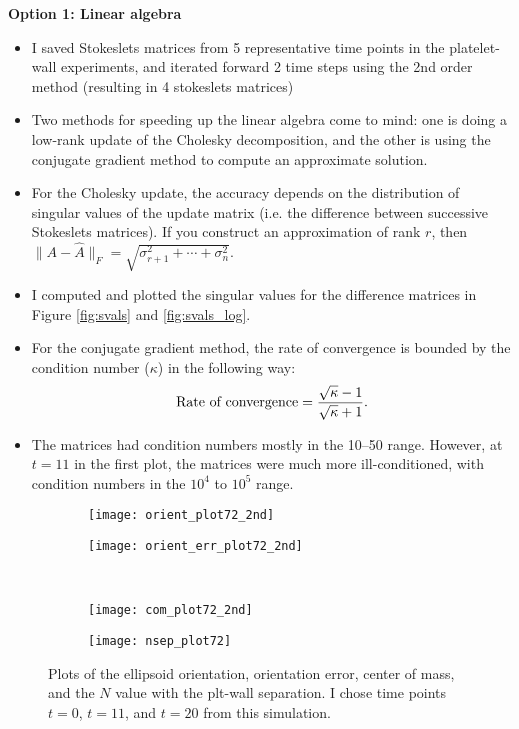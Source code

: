 \documentclass{article}
\newcommand{\tn}{\textnormal}
\begin{document}
\textbf{Option 1: Linear algebra}
\begin{itemize}
\item I saved Stokeslets matrices from 5 representative time points in
  the platelet-wall experiments, and iterated forward 2 time steps
  using the 2nd order method (resulting in 4 stokeslets matrices)
\item Two methods for speeding up the linear algebra come to mind: one
  is doing a low-rank update of the Cholesky decomposition, and the
  other is using the conjugate gradient method to compute an
  approximate solution.
\item For the Cholesky update, the accuracy depends on the
  distribution of singular values of the update matrix (i.e. the
  difference between successive Stokeslets matrices). If you construct
  an approximation of rank $r$, then $\|A - \hat{A}\|_F =
  \sqrt{\sigma_{r+1}^2 + \cdots + \sigma_{n}^2}$.
\item I computed and plotted the singular values for the difference
  matrices in Figure \ref{fig:svals} and \ref{fig:svals_log}.
\item For the conjugate gradient method, the rate of convergence is
  bounded by the condition number ($\kappa$) in the following way:
  \[
    \tn{Rate of convergence} = \frac{\sqrt{\kappa} - 1}{\sqrt{\kappa} + 1}.
  \]
\item The matrices had condition numbers mostly in the 10--50
  range. However, at $t=11$ in the first plot, the matrices were much
  more ill-conditioned, with condition numbers in the $10^4$ to $10^5$
  range.
\end{itemize}

\begin{figure}[b]
  \centering
  \begin{subfigure}{0.49\textwidth}
    \texttt{[image: orient\_plot72\_2nd]}
  \end{subfigure}
  \hfill
  \begin{subfigure}{0.49\textwidth}
    \texttt{[image: orient\_err\_plot72\_2nd]}
  \end{subfigure}
  \\
  \begin{subfigure}{0.49\textwidth}
    \texttt{[image: com\_plot72\_2nd]}
  \end{subfigure}
  \hfill
  \begin{subfigure}{0.49\textwidth}
    \texttt{[image: nsep\_plot72]}
  \end{subfigure}  
  \caption{Plots of the ellipsoid orientation, orientation error,
    center of mass, and the $N$ value with the plt-wall
    separation. I chose time points $t=0$, $t=11$, and $t=20$ from
    this simulation.}
  \label{fig:plt72}
\end{figure}
\end{document}
